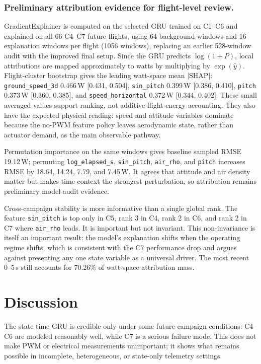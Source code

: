 \documentclass[runningheads,a4paper]{llncs}
\begin{document}
\subsubsection{Preliminary attribution evidence for flight-level review.}
GradientExplainer is computed on the selected GRU trained on C1--C6 and explained on all 66 C4--C7 future flights, using 64 background windows and 16 explanation windows per flight (1056 windows), replacing an earlier 528-window audit with the improved final setup. Since the GRU predicts $\log(1+P)$, local attributions are mapped approximately to watts by multiplying by $\exp(\hat{y})$. Flight-cluster bootstrap gives the leading watt-space mean $|\mathrm{SHAP}|$: \texttt{ground\_speed\_3d} 0.466\,W [0.431, 0.504], \texttt{sin\_pitch} 0.399\,W [0.386, 0.410], \texttt{pitch} 0.373\,W [0.360, 0.385], and \texttt{speed\_horizontal} 0.372\,W [0.344, 0.402]. These small averaged values support ranking, not additive flight-energy accounting. They also have the expected physical reading: speed and attitude variables dominate because the no-PWM feature policy leaves aerodynamic state, rather than actuator demand, as the main observable pathway.

Permutation importance on the same windows gives baseline sampled RMSE 19.12\,W; permuting \texttt{log\_elapsed\_s}, \texttt{sin\_pitch}, \texttt{air\_rho}, and \texttt{pitch} increases RMSE by 18.64, 14.24, 7.79, and 7.45\,W. It agrees that attitude and air density matter but makes time context the strongest perturbation, so attribution remains preliminary model-audit evidence.

Cross-campaign stability is more informative than a single global rank. The feature \texttt{sin\_pitch} is top only in C5, rank 3 in C4, rank 2 in C6, and rank 2 in C7 where \texttt{air\_rho} leads. It is important but not invariant. This non-invariance is itself an important result: the model's explanation shifts when the operating regime shifts, which is consistent with the C7 performance drop and argues against presenting any one state variable as a universal driver. The most recent 0--5\,s still accounts for 70.26\% of watt-space attribution mass.

\FloatBarrier

\section{Discussion}

The state time GRU is credible only under some future-campaign conditions: C4--C6 are modeled reasonably well, while C7 is a serious failure mode. This does not make PWM or electrical measurements unimportant; it shows what remains possible in incomplete, heterogeneous, or state-only telemetry settings.
\end{document}
